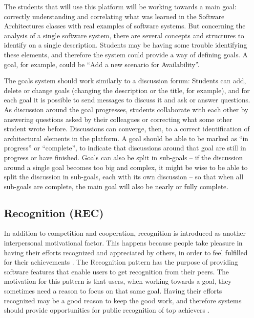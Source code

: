 The students that will use this platform will be working towards a main goal: correctly understanding and correlating what was learned in the Software Architectures classes with real examples of software systems. But concerning the analysis of a single software system, there are several concepts and structures to identify on a single description. Students may be having some trouble identifying these elements, and therefore the system could provide a way of defining goals. A goal, for example, could be ``Add a new scenario for Availability''. 

The goals system should work similarly to a discussion forum: Students can add, delete or change goals (changing the description or the title, for example), and for each goal it is possible to send messages to discuss it and ask or answer questions. As discussion around the goal progresses, students collaborate with each other by answering questions asked by their colleagues or correcting what some other student wrote before. Discussions can converge, then, to a correct identification of architectural elements in the platform. A goal should be able to be marked as ``in progress'' or ``complete'', to indicate that discussions around that goal are still in progress or have finished. 
Goals can also be split in sub-goals – if the discussion around a single goal becomes too big and complex, it might be wise to be able to split the discussion in sub-goals, each with its own discussion – so that when all sub-goals are complete, the main goal will also be nearly or fully complete. 

\subsection{Recognition (REC)}

In addition to competition and cooperation, recognition is introduced as another interpersonal motivational factor. This happens because people take pleasure in having their efforts recognized and appreciated by others, in order to feel fulfilled for their achievements \cite{malone1987making}. 
The Recognition pattern has the purpose of providing software features that enable users to get recognition from their peers. The motivation for this pattern is that users, when working towards a goal, they sometimes need a reason to focus on that same goal. Having their efforts recognized may be a good reason to keep the good work, and therefore systems should provide opportunities for public recognition of top achievers \cite{oduor2014persuasive}. 


